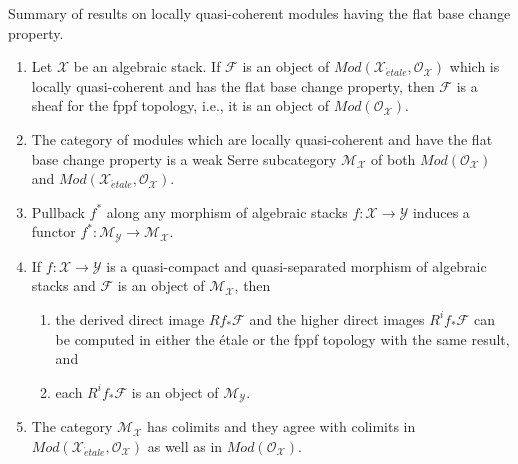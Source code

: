 \begin{proposition}
\label{proposition-lcq-flat-base-change}
Summary of results on locally quasi-coherent modules having the flat
base change property.
\begin{enumerate}
\item Let $\mathcal{X}$ be an algebraic stack.
If $\mathcal{F}$ is an object of
$\textit{Mod}(\mathcal{X}_{\acute{e}tale}, \mathcal{O}_\mathcal{X})$
which is locally quasi-coherent and has the flat base change property,
then $\mathcal{F}$ is a sheaf for the fppf topology, i.e., it is
an object of $\textit{Mod}(\mathcal{O}_\mathcal{X})$.
\item The category of modules which are locally quasi-coherent
and have the flat base change property is a weak Serre subcategory
$\mathcal{M}_\mathcal{X}$ of both $\textit{Mod}(\mathcal{O}_\mathcal{X})$
and $\textit{Mod}(\mathcal{X}_{\acute{e}tale}, \mathcal{O}_\mathcal{X})$.
\item Pullback $f^*$ along any morphism of algebraic stacks
$f : \mathcal{X} \to \mathcal{Y}$ induces a functor
$f^* : \mathcal{M}_\mathcal{Y} \to \mathcal{M}_\mathcal{X}$.
\item If $f : \mathcal{X} \to \mathcal{Y}$ is a
quasi-compact and quasi-separated morphism of algebraic stacks
and $\mathcal{F}$ is an object of $\mathcal{M}_\mathcal{X}$, then
\begin{enumerate}
\item the derived direct image $Rf_*\mathcal{F}$ and the higher direct
images $R^if_*\mathcal{F}$ can be computed in either the \'etale or the
fppf topology with the same result, and
\item each $R^if_*\mathcal{F}$ is an object of $\mathcal{M}_\mathcal{Y}$.
\end{enumerate}
\item The category $\mathcal{M}_\mathcal{X}$ has colimits and they agree
with colimits in
$\textit{Mod}(\mathcal{X}_{\acute{e}tale}, \mathcal{O}_\mathcal{X})$
as well as in $\textit{Mod}(\mathcal{O}_\mathcal{X})$.
\end{enumerate}
\end{proposition}


